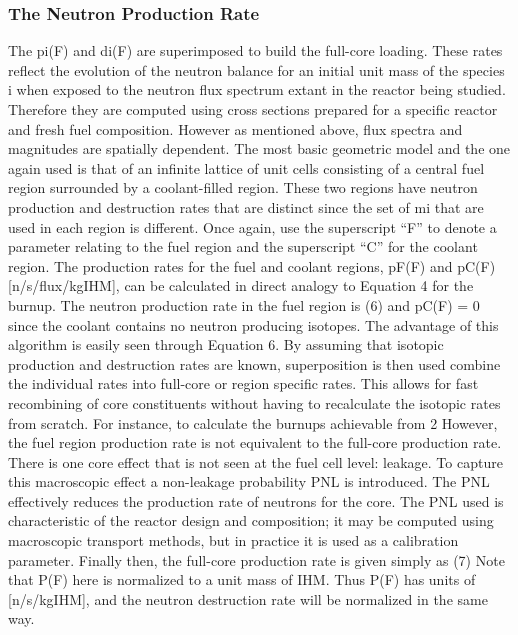 \subsubsection{The Neutron Production Rate}
\label{1g_sec:p_rate}
 The pi(F) and di(F) are superimposed to build the full-core loading.  These rates reflect the evolution of the neutron balance for an initial unit mass of the species i when exposed to the neutron flux spectrum extant in the reactor being studied.  Therefore they are computed using cross sections prepared for a specific reactor and fresh fuel composition.
However as mentioned above, flux spectra and magnitudes are spatially dependent.  The most basic geometric model and the one again used is that of an infinite lattice of unit cells consisting of a central fuel region surrounded by a coolant-filled region.  These two regions have neutron production and destruction rates that are distinct since the set of mi that are used in each region is different.  Once again, use the superscript “F” to denote a parameter relating to the fuel region and the superscript “C” for the coolant region. 
The production rates for the fuel and coolant regions, pF(F) and pC(F) [n/s/flux/kgIHM], can be calculated in direct analogy to Equation 4 for the burnup.  The neutron production rate in the fuel region is 
                                (6)
and pC(F) = 0 since the coolant contains no neutron producing isotopes.  
The advantage of this algorithm is easily seen through Equation 6.  By assuming that isotopic production and destruction rates are known, superposition is then used combine the individual rates into full-core or region specific rates.  This allows for fast recombining of core constituents without having to recalculate the isotopic rates from scratch.  For instance, to calculate the burnups achievable from 2%
However, the fuel region production rate is not equivalent to the full-core production rate.  There is one core effect that is not seen at the fuel cell level: leakage.  To capture this macroscopic effect a non-leakage probability PNL is introduced.  The PNL effectively reduces the production rate of neutrons for the core. The PNL used is characteristic of the reactor design and composition; it may be computed using macroscopic transport methods, but in practice it is used as a calibration parameter.  Finally then, the full-core production rate is given simply as 
                                        (7)
Note that P(F) here is normalized to a unit mass of IHM.  Thus P(F) has units of [n/s/kgIHM], and the neutron destruction rate will be normalized in the same way.



